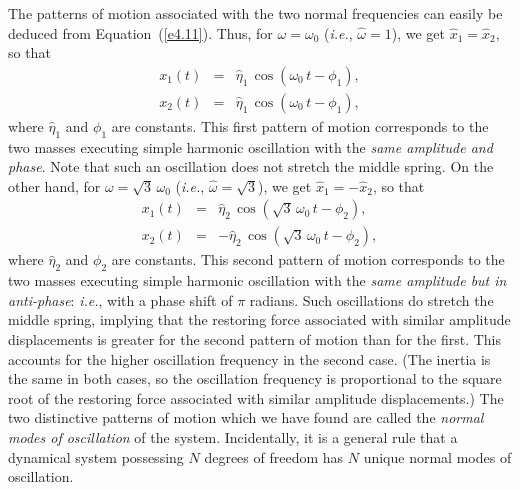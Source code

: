 The patterns of motion associated with the two normal frequencies 
can easily be deduced  from Equation~(\ref{e4.11}). Thus, for $\omega=\omega_0$ ({\em i.e.}, $\hat{\omega}=1$), we
get $\hat{x}_1=\hat{x}_2$, so that
\begin{eqnarray}\label{e4.16}
x_1(t) &=& \hat{\eta}_1\,\cos(\omega_0\,t-\phi_1),\\[0.5ex]
x_2(t)&=&\hat{\eta}_1\,\cos(\omega_0\,t-\phi_1),\label{e4.17}
\end{eqnarray}
where $\hat{\eta}_1$ and $\phi_1$ are constants. This first pattern of motion corresponds to the two masses
 executing simple harmonic oscillation with the {\em same amplitude and phase}. 
Note that such an oscillation does not stretch the middle spring.  
On the other hand, for
$\omega=\sqrt{3}\,\omega_0$ ({\em i.e.}, $\hat{\omega}=\sqrt{3}$), we get $\hat{x}_1=-\hat{x}_2$, so that
\begin{eqnarray}\label{e4.18}
x_1(t) &=& \hat{\eta}_2\,\cos\left(\sqrt{3}\,\omega_0\,t-\phi_2\right),\\[0.5ex]
x_2(t)&=&-\hat{\eta}_2\,\cos\left(\sqrt{3}\,\omega_0\,t-\phi_2\right),\label{e4.19}
\end{eqnarray}
where $\hat{\eta}_2$ and $\phi_2$ are constants. This second pattern of motion
corresponds to the two masses executing simple harmonic oscillation with the
{\em same amplitude but in anti-phase}: {\em i.e.}, with a phase shift of $\pi$ radians. Such oscillations do stretch the
middle spring, implying that the  restoring force associated with
similar amplitude displacements is greater for the second
pattern of motion than for the first. This accounts for the higher
oscillation frequency in the second case.  (The inertia is the same in both cases, so the
oscillation frequency is proportional to the square root of the restoring force
associated with similar amplitude displacements.) The two distinctive
patterns of motion which we have found are called the {\em normal modes of
oscillation}\/ of the system. Incidentally, it is a general rule that a dynamical system
possessing $N$ degrees of freedom has $N$ unique normal modes of oscillation.

